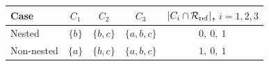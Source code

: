 \begingroup
\small\setlength{\tabcolsep}{6pt}
\begin{tabular}{@{}lcccc@{}}
\toprule
Case & $C_1$ & $C_2$ & $C_3$ & $|C_i\cap\mathcal R_{\rm ref}|$, $i=1,2,3$ \\
\midrule
Nested & $\{b\}$ & $\{b,c\}$ & $\{a,b,c\}$ & $0,\ 0,\ 1$ \\
Non-nested & $\{a\}$ & $\{b,c\}$ & $\{a,b,c\}$ & $1,\ 0,\ 1$ \\
\bottomrule
\end{tabular}
\endgroup
